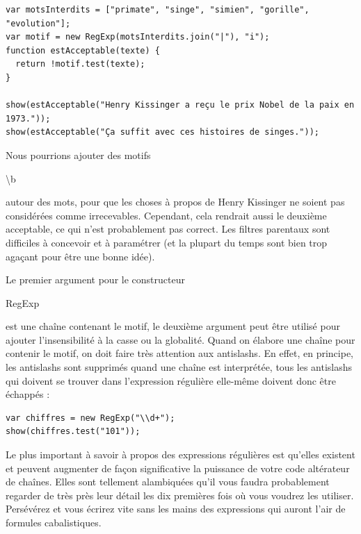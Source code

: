 \documentclass{FramateX}
\renewcommand{\texttt}[1]{\begin{sffamily}{#1}\end{sffamily}}
\begin{document}
\begin{lstlisting}
var motsInterdits = ["primate", "singe", "simien", "gorille", "evolution"];
var motif = new RegExp(motsInterdits.join("|"), "i");
function estAcceptable(texte) {
  return !motif.test(texte);
}

show(estAcceptable("Henry Kissinger a reçu le prix Nobel de la paix en 1973."));
show(estAcceptable("Ça suffit avec ces histoires de singes."));
\end{lstlisting}
Nous pourrions ajouter des motifs \texttt{\textbackslash{}b} autour des
mots, pour que les choses à propos de Henry Kissinger ne soient pas
considérées comme irrecevables. Cependant, cela rendrait aussi le
deuxième acceptable, ce qui n'est probablement pas correct. Les filtres
parentaux sont difficiles à concevoir et à paramétrer (et la plupart du
temps sont bien trop agaçant pour être une bonne idée).

Le premier argument pour le constructeur \texttt{RegExp} est une chaîne
contenant le motif, le deuxième argument peut être utilisé pour ajouter
l'insensibilité à la casse ou la globalité. Quand on élabore une chaîne
pour contenir le motif, on doit faire très attention aux antislashs. En
effet, en principe, les antislashs sont supprimés quand une chaîne est
interprétée, tous les antislashs qui doivent se trouver dans
l'expression régulière elle-même doivent donc être échappés :

\begin{lstlisting}
var chiffres = new RegExp("\\d+");
show(chiffres.test("101"));
\end{lstlisting}
\begin{center}\end{center}

Le plus important à savoir à propos des expressions régulières est
qu'elles existent et peuvent augmenter de façon significative la
puissance de votre code altérateur de chaînes. Elles sont tellement
alambiquées qu'il vous faudra probablement regarder de très près leur
détail les dix premières fois où vous voudrez les utiliser. Persévérez
et vous écrirez vite sans les mains des expressions qui auront l'air de
formules cabalistiques.
\end{document}
